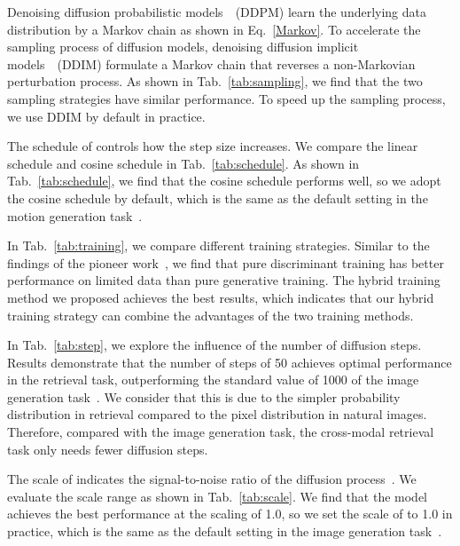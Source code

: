 \documentclass[10pt,twocolumn,letterpaper]{article}
\begin{document}
{ Denoising diffusion probabilistic models~\cite{ho2020denoising}~(DDPM) learn the underlying data distribution by a Markov chain as shown in Eq.~\ref{Markov}. To accelerate the sampling process of diffusion models, denoising diffusion implicit models~\cite{song2020denoising}~(DDIM) formulate a Markov chain that reverses a non-Markovian perturbation process. As shown in Tab.~\ref{tab:sampling}, we find that the two sampling strategies have similar performance. To speed up the sampling process, we use DDIM by default in practice.

 The schedule of  controls how the step size increases. We compare the linear schedule and cosine schedule in Tab.~\ref{tab:schedule}. As shown in Tab.~\ref{tab:schedule}, we find that the cosine schedule performs well, so we adopt the cosine schedule by default, which is the same as the default setting in the motion generation task~\cite{tevet2022human}.

 In Tab.~\ref{tab:training}, we compare different training strategies. Similar to the findings of the pioneer work~\cite{bernardo2007generative}, we find that pure discriminant training has better performance on limited data than pure generative training. The hybrid training method we proposed achieves the best results, which indicates that our hybrid training strategy can combine the advantages of the two training methods.

 In Tab.~\ref{tab:step}, we explore the influence of the number of diffusion steps. Results demonstrate that the number of steps of 50 achieves optimal performance in the retrieval task, outperforming the standard value of 1000 of the image generation task~\cite{ho2020denoising,dhariwal2021diffusion}. We consider that this is due to the simpler probability distribution in retrieval compared to the pixel distribution in natural images. Therefore, compared with the image generation task, the cross-modal retrieval task only needs fewer diffusion steps.

 The scale of  indicates the signal-to-noise ratio of the diffusion process~\cite{chen2022diffusiondet}. We evaluate the scale range  as shown in Tab.~\ref{tab:scale}. We find that the model achieves the best performance at the scaling of 1.0, so we set the scale of  to 1.0 in practice, which is the same as the default setting in the image generation task~\cite{dhariwal2021diffusion}.

}
\end{document}
